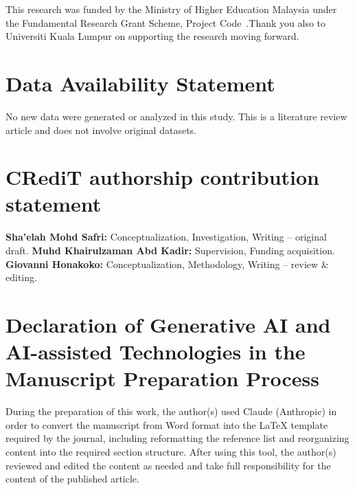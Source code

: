 \documentclass[preprint,12pt]{elsarticle}
\begin{document}
	This research was funded by the Ministry of Higher Education Malaysia under the Fundamental Research Grant Scheme, Project Code~.Thank you also to Universiti Kuala Lumpur on supporting the research moving forward.
	
	\section*{Data Availability Statement}
	
	No new data were generated or analyzed in this study. This is a literature review article and does not involve original datasets.
	
	\section*{CRediT authorship contribution statement}
	
	\textbf{Sha'elah Mohd Safri:} Conceptualization, Investigation, Writing -- original draft. \textbf{Muhd Khairulzaman Abd Kadir:} Supervision, Funding acquisition. \textbf{Giovanni Honakoko:} Conceptualization, Methodology, Writing -- review \& editing.
	
	\section*{Declaration of Generative AI and AI-assisted Technologies in the Manuscript Preparation Process}
	
	During the preparation of this work, the author(s) used Claude (Anthropic) in order to convert the manuscript from Word format into the LaTeX template required by the journal, including reformatting the reference list and reorganizing content into the required section structure. After using this tool, the author(s) reviewed and edited the content as needed and take full responsibility for the content of the published article.
	
\end{document}
